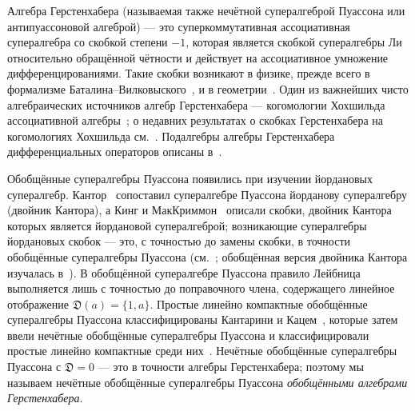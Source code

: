 \documentclass[11pt,reqno]{amsart}
\newcommand{\D}{\mathfrak D}
\theoremstyle{plain}
\theoremstyle{definition}
\theoremstyle{remark}
\begin{document}
Алгебра Герстенхабера (называемая также нечётной супералгеброй Пуассона или антипуассоновой алгеброй) --- это суперкоммутативная ассоциативная супералгебра со скобкой степени $-1$, которая является скобкой супералгебры Ли относительно обращённой чётности и действует на ассоциативное умножение дифференцированиями.
Такие скобки возникают в физике, прежде всего в формализме Баталина--Вилковыского~\cite{BV81,p1,p2}, и в геометрии~\cite{p3}.
Один из важнейших чисто алгебраических источников алгебр Герстенхабера --- когомологии Хохшильда ассоциативной алгебры~\cite{Ger63}; о недавних результатах о скобках Герстенхабера на когомологиях Хохшильда см.~\cite{W21,V16,V19,L21}.
Подалгебры алгебры Герстенхабера дифференциальных операторов описаны в~\cite{B06}.

Обобщённые супералгебры Пуассона появились при изучении йордановых супералгебр.
Кантор~\cite{Kan90,Kan92} сопоставил супералгебре Пуассона йорданову супералгебру (двойник Кантора), а Кинг и МакКриммон~\cite{KM92} описали скобки, двойник Кантора которых является йордановой супералгеброй; возникающие супералгебры йордановых скобок --- это, с точностью до замены скобки, в точности обобщённые супералгебры Пуассона (см.~\cite{CK07,K17}; обобщённая версия двойника Кантора изучалась в~\cite{K10}).
В обобщённой супералгебре Пуассона правило Лейбница выполняется лишь с точностью до поправочного члена, содержащего линейное отображение $\D(a)=\{1,a\}$.
Простые линейно компактные обобщённые супералгебры Пуассона классифицированы Кантарини и Кацем~\cite{CK07}, которые затем ввели нечётные обобщённые супералгебры Пуассона и классифицировали простые линейно компактные среди них~\cite{CK10}.
Нечётные обобщённые супералгебры Пуассона с $\D=0$ --- это в точности алгебры Герстенхабера; поэтому мы называем нечётные обобщённые супералгебры Пуассона \emph{обобщёнными алгебрами Герстенхабера}.
\end{document}
